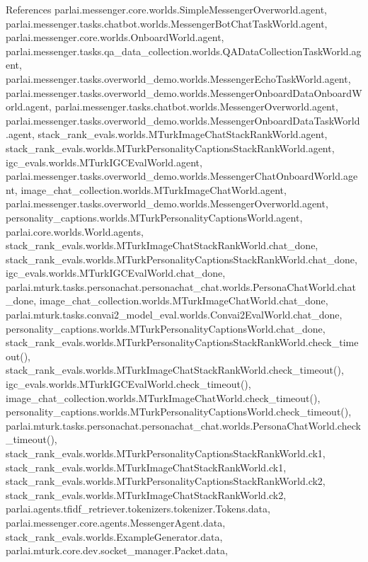 References parlai.\+messenger.\+core.\+worlds.\+Simple\+Messenger\+Overworld.\+agent, parlai.\+messenger.\+tasks.\+chatbot.\+worlds.\+Messenger\+Bot\+Chat\+Task\+World.\+agent, parlai.\+messenger.\+core.\+worlds.\+Onboard\+World.\+agent, parlai.\+messenger.\+tasks.\+qa\+\_\+data\+\_\+collection.\+worlds.\+Q\+A\+Data\+Collection\+Task\+World.\+agent, parlai.\+messenger.\+tasks.\+overworld\+\_\+demo.\+worlds.\+Messenger\+Echo\+Task\+World.\+agent, parlai.\+messenger.\+tasks.\+overworld\+\_\+demo.\+worlds.\+Messenger\+Onboard\+Data\+Onboard\+World.\+agent, parlai.\+messenger.\+tasks.\+chatbot.\+worlds.\+Messenger\+Overworld.\+agent, parlai.\+messenger.\+tasks.\+overworld\+\_\+demo.\+worlds.\+Messenger\+Onboard\+Data\+Task\+World.\+agent, stack\+\_\+rank\+\_\+evals.\+worlds.\+M\+Turk\+Image\+Chat\+Stack\+Rank\+World.\+agent, stack\+\_\+rank\+\_\+evals.\+worlds.\+M\+Turk\+Personality\+Captions\+Stack\+Rank\+World.\+agent, igc\+\_\+evals.\+worlds.\+M\+Turk\+I\+G\+C\+Eval\+World.\+agent, parlai.\+messenger.\+tasks.\+overworld\+\_\+demo.\+worlds.\+Messenger\+Chat\+Onboard\+World.\+agent, image\+\_\+chat\+\_\+collection.\+worlds.\+M\+Turk\+Image\+Chat\+World.\+agent, parlai.\+messenger.\+tasks.\+overworld\+\_\+demo.\+worlds.\+Messenger\+Overworld.\+agent, personality\+\_\+captions.\+worlds.\+M\+Turk\+Personality\+Captions\+World.\+agent, parlai.\+core.\+worlds.\+World.\+agents, stack\+\_\+rank\+\_\+evals.\+worlds.\+M\+Turk\+Image\+Chat\+Stack\+Rank\+World.\+chat\+\_\+done, stack\+\_\+rank\+\_\+evals.\+worlds.\+M\+Turk\+Personality\+Captions\+Stack\+Rank\+World.\+chat\+\_\+done, igc\+\_\+evals.\+worlds.\+M\+Turk\+I\+G\+C\+Eval\+World.\+chat\+\_\+done, parlai.\+mturk.\+tasks.\+personachat.\+personachat\+\_\+chat.\+worlds.\+Persona\+Chat\+World.\+chat\+\_\+done, image\+\_\+chat\+\_\+collection.\+worlds.\+M\+Turk\+Image\+Chat\+World.\+chat\+\_\+done, parlai.\+mturk.\+tasks.\+convai2\+\_\+model\+\_\+eval.\+worlds.\+Convai2\+Eval\+World.\+chat\+\_\+done, personality\+\_\+captions.\+worlds.\+M\+Turk\+Personality\+Captions\+World.\+chat\+\_\+done, stack\+\_\+rank\+\_\+evals.\+worlds.\+M\+Turk\+Personality\+Captions\+Stack\+Rank\+World.\+check\+\_\+timeout(), stack\+\_\+rank\+\_\+evals.\+worlds.\+M\+Turk\+Image\+Chat\+Stack\+Rank\+World.\+check\+\_\+timeout(), igc\+\_\+evals.\+worlds.\+M\+Turk\+I\+G\+C\+Eval\+World.\+check\+\_\+timeout(), image\+\_\+chat\+\_\+collection.\+worlds.\+M\+Turk\+Image\+Chat\+World.\+check\+\_\+timeout(), personality\+\_\+captions.\+worlds.\+M\+Turk\+Personality\+Captions\+World.\+check\+\_\+timeout(), parlai.\+mturk.\+tasks.\+personachat.\+personachat\+\_\+chat.\+worlds.\+Persona\+Chat\+World.\+check\+\_\+timeout(), stack\+\_\+rank\+\_\+evals.\+worlds.\+M\+Turk\+Personality\+Captions\+Stack\+Rank\+World.\+ck1, stack\+\_\+rank\+\_\+evals.\+worlds.\+M\+Turk\+Image\+Chat\+Stack\+Rank\+World.\+ck1, stack\+\_\+rank\+\_\+evals.\+worlds.\+M\+Turk\+Personality\+Captions\+Stack\+Rank\+World.\+ck2, stack\+\_\+rank\+\_\+evals.\+worlds.\+M\+Turk\+Image\+Chat\+Stack\+Rank\+World.\+ck2, parlai.\+agents.\+tfidf\+\_\+retriever.\+tokenizers.\+tokenizer.\+Tokens.\+data, parlai.\+messenger.\+core.\+agents.\+Messenger\+Agent.\+data, stack\+\_\+rank\+\_\+evals.\+worlds.\+Example\+Generator.\+data, parlai.\+mturk.\+core.\+dev.\+socket\+\_\+manager.\+Packet.\+data, 